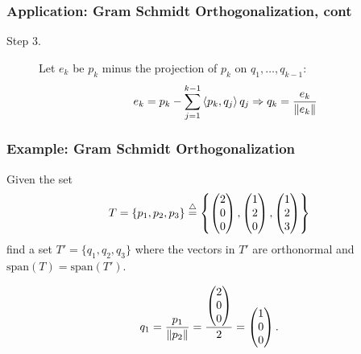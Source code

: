 \documentclass{beamer}
\begin{document}
\begin{frame}\frametitle{Application:  Gram Schmidt Orthogonalization, cont}

\begin{description}
\item[Step 3.]
Let $e_k$ be $p_k$ minus the projection of $p_k$ on $q_1, \ldots, q_{k-1}$:
\[ e_k = p_k - \sum_{j=1}^{k-1}\left< p_k, q_j\right> q_j \Rightarrow q_k = \frac{e_k}{\left\| e_k \right\|} \]
\end{description}
\end{frame}

\begin{frame}\frametitle{Example: Gram Schmidt Orthogonalization}
Given the set
\[
T = \{ p_1, p_2, p_3 \} \stackrel{\triangle}{=} \left\{ \begin{pmatrix} 2 \\ 0 \\ 0 \end{pmatrix}, \begin{pmatrix}1 \\ 2 \\ 0 \end{pmatrix}, \begin{pmatrix} 1 \\ 2 \\ 3 \end{pmatrix} \right\}
\]	
find a set $T'=\{q_1, q_2, q_3\}$ where the vectors in $T'$ are orthonormal and $\text{span}(T)=\text{span}(T')$.

\vfill

\[
q_1 = \frac{p_1}{\left\|p_2\right\|} = \frac{\begin{pmatrix} 2 \\ 0 \\ 0 \end{pmatrix}}{2} = \begin{pmatrix} 1 \\ 0 \\ 0 \end{pmatrix}.
\]

\end{frame}
\end{document}
